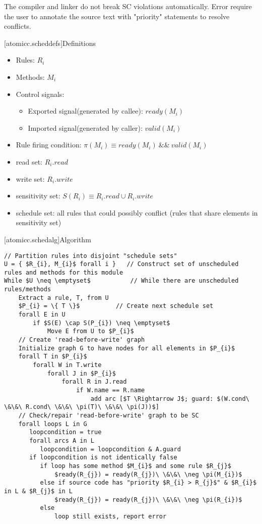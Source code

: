 The compiler and linker do not break SC violations automatically. Error require the user to annotate
the source text with "priority" statements to resolve conflicts.

[atomicc.scheddefs]{Definitions}
\begin{itemize}
\item Rules: $R_{i}$
\item Methods: $M_{i}$
\item Control signals:
\begin {itemize}
\item Exported signal(generated by callee):  $ready(M_{i})$
\item Imported signal(generated by caller):  $valid(M_{i})$
\end{itemize}
\item Rule firing condition: $\pi(M_{i}) \equiv ready(M_{i})\ \&\&\ valid(M_{i})$
\item read set: $R_{i}.read$
\item write set: $R_{i}.write$
\item sensitivity set: $S(R_{i}) \equiv R_{i}.read \cup R_{i}.write$
\item schedule set: all rules that could possibly conflict (rules that share elements in sensitivity set)
\end{itemize}

[atomicc.schedalg]{Algorithm}

\begin{lstlisting}[mathescape=true]
// Partition rules into disjoint "schedule sets"
U = { $R_{i}, M_{i}$ forall i }   // Construct set of unscheduled rules and methods for this module
While $U \neq \emptyset$           // While there are unscheduled rules/methods
    Extract a rule, T, from U
    $P_{i} = \{ T \}$          // Create next schedule set
    forall E in U
        if $S(E) \cap S(P_{i}) \neq \emptyset$
            Move E from U to $P_{i}$
    // Create 'read-before-write' graph
    Initialize graph G to have nodes for all elements in $P_{i}$
    forall T in $P_{i}$
        forall W in T.write
            forall J in $P_{i}$
                forall R in J.read
                    if W.name == R.name
                        add arc [$T \Rightarrow J$; guard: $(W.cond\ \&\&\ R.cond\ \&\&\ \pi(T)\ \&\&\ \pi(J))$]
    // Check/repair 'read-before-write' graph to be SC
    forall loops L in G
       loopcondition = true
       forall arcs A in L 
          loopcondition = loopcondition & A.guard
       if loopcondition is not identically false
          if loop has some method $M_{i}$ and some rule $R_{j}$
              $ready(R_{j}) = ready(R_{j})\ \&\&\ \neg \pi(M_{i})$
          else if source code has "priority $R_{i} > R_{j}$" & $R_{i}$ in L & $R_{j}$ in L
              $ready(R_{j}) = ready(R_{j})\ \&\&\ \neg \pi(R_{i})$
          else
              loop still exists, report error
\end{lstlisting}


